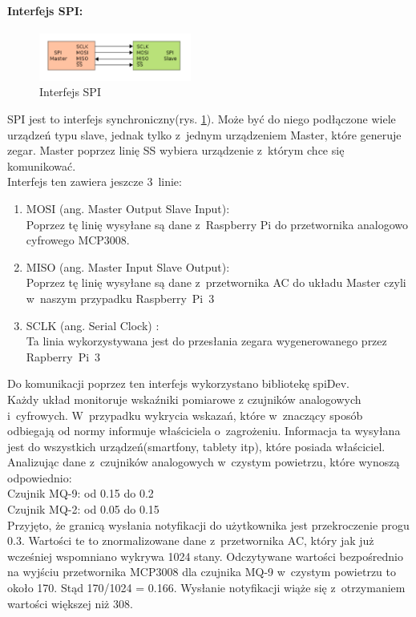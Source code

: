 \paragraph{Interfejs SPI:}
\begin{figure}[ht]
	\centering
	\includegraphics[width=5cm]{SPI.png}
	\caption{Interfejs SPI \protect\cite{spi}}
	\label{spi}
\end{figure}
SPI jest to interfejs synchroniczny(rys. \ref{spi}). Może być do niego podłączone wiele urządzeń typu slave, jednak tylko z~jednym urządzeniem Master, które generuje zegar. Master poprzez linię SS wybiera urządzenie z~którym chce się komunikować. \\
Interfejs ten zawiera jeszcze 3~linie:
\begin{enumerate} 
\item MOSI (ang. Master Output Slave Input): \\
Poprzez tę linię wysyłane są dane z~Raspberry Pi do przetwornika analogowo cyfrowego MCP3008.
\item MISO (ang. Master Input Slave Output):\\
Poprzez tę linię wysyłane są dane z~przetwornika AC do układu Master czyli w~naszym przypadku Raspberry~Pi~3
\item SCLK (ang. Serial Clock) :\\
Ta linia wykorzystywana jest do przesłania zegara wygenerowanego przez Rapberry~Pi~3
\end{enumerate}
Do komunikacji poprzez ten interfejs wykorzystano bibliotekę spiDev. \\
Każdy układ monitoruje wskaźniki pomiarowe z czujników analogowych i~cyfrowych. W~przypadku wykrycia wskazań, które w~znaczący sposób odbiegają od normy informuje właściciela o~zagrożeniu. Informacja ta wysyłana jest do wszystkich urządzeń(smartfony, tablety itp), które posiada właściciel.  Analizując dane z~czujników analogowych w~czystym powietrzu, które wynoszą odpowiednio:\\
Czujnik MQ-9: od 0.15 do 0.2\\
Czujnik MQ-2: od 0.05 do 0.15\\
Przyjęto, że granicą wysłania notyfikacji do użytkownika jest przekroczenie progu 0.3. Wartości te to znormalizowane dane z~przetwornika AC, który jak już wcześniej wspomniano wykrywa 1024 stany. Odczytywane wartości bezpośrednio na wyjściu przetwornika MCP3008 dla czujnika MQ-9 w~czystym powietrzu to około 170. Stąd 170/1024 = 0.166. Wysłanie notyfikacji wiąże się z~otrzymaniem wartości większej niż 308.
